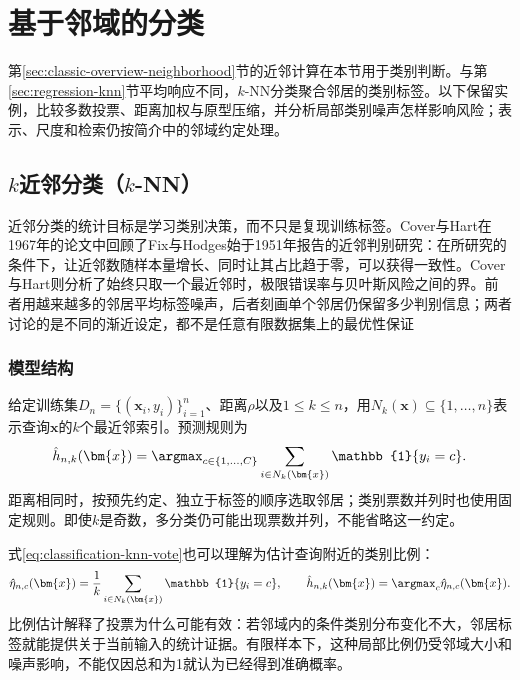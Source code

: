 \section{基于邻域的分类}
\label{sec:classification-instances}

第\ref{sec:classic-overview-neighborhood}节的近邻计算在本节用于类别判断。与第\ref{sec:regression-knn}节平均响应不同，$k$-NN分类聚合邻居的类别标签。以下保留实例，比较多数投票、距离加权与原型压缩，并分析局部类别噪声怎样影响风险；表示、尺度和检索仍按简介中的邻域约定处理。

\subsection{$k$近邻分类（$k$-NN）}
\label{sec:classification-knn}

近邻分类的统计目标是学习类别决策，而不只是复现训练标签。Cover与Hart在1967年的论文中回顾了Fix与Hodges始于1951年报告的近邻判别研究：在所研究的条件下，让近邻数随样本量增长、同时让其占比趋于零，可以获得一致性。Cover与Hart则分析了始终只取一个最近邻时，极限错误率与贝叶斯风险之间的界。前者用越来越多的邻居平均标签噪声，后者刻画单个邻居仍保留多少判别信息；两者讨论的是不同的渐近设定，都不是任意有限数据集上的最优性保证

\subsubsection{模型结构}
\label{sec:classification-knn-structure}

给定训练集$D_n=\{(\bm{x}_i,y_i)\}_{i=1}^n$、距离$\rho$以及$1\leq k\leq n$，用$N_k(\bm{x})\subseteq\{1,\ldots,n\}$表示查询$\bm{x}$的$k$个最近邻索引。预测规则为
\begin{equation}
  \hat h_{n,k}(\bm{x})
  =\argmax_{c\in\{1,\ldots,C\}}
  \sum_{i\in N_k(\bm{x})}\mathbb{1}\{y_i=c\}.
  \label{eq:classification-knn-vote}
\end{equation}
距离相同时，按预先约定、独立于标签的顺序选取邻居；类别票数并列时也使用固定规则。即使$k$是奇数，多分类仍可能出现票数并列，不能省略这一约定。

式\eqref{eq:classification-knn-vote}也可以理解为估计查询附近的类别比例：
\begin{equation}
  \hat\eta_{n,c}(\bm{x})
  =\frac{1}{k}\sum_{i\in N_k(\bm{x})}\mathbb{1}\{y_i=c\},
  \qquad
  \hat h_{n,k}(\bm{x})=\argmax_c\hat\eta_{n,c}(\bm{x}).
  \label{eq:classification-knn-posterior}
\end{equation}
比例估计解释了投票为什么可能有效：若邻域内的条件类别分布变化不大，邻居标签就能提供关于当前输入的统计证据。有限样本下，这种局部比例仍受邻域大小和噪声影响，不能仅因总和为1就认为已经得到准确概率。

